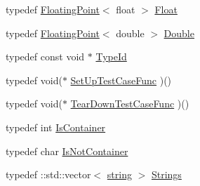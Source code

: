 \begin{DoxyCompactItemize}
typedef \hyperlink{classtesting_1_1internal_1_1_floating_point}{Floating\-Point}$<$ float $>$ \hyperlink{namespacetesting_1_1internal_a97de600d6dbfffe7091b878ac4b3a9a7}{Float}
\item 
typedef \hyperlink{classtesting_1_1internal_1_1_floating_point}{Floating\-Point}$<$ double $>$ \hyperlink{namespacetesting_1_1internal_a92debc9f055b7e7e1e4e861c5ae1c67a}{Double}
\item 
typedef const void $\ast$ \hyperlink{namespacetesting_1_1internal_a38c435cbab5f8b784e2e7f3356cab242}{Type\-Id}
\item 
typedef void($\ast$ \hyperlink{namespacetesting_1_1internal_ada14d66b5460b20e09071f51b9885c8d}{Set\-Up\-Test\-Case\-Func} )()
\item 
typedef void($\ast$ \hyperlink{namespacetesting_1_1internal_aad40244621b68546f3b830696225bf9b}{Tear\-Down\-Test\-Case\-Func} )()
\item 
typedef int \hyperlink{namespacetesting_1_1internal_ad8f0c2883245f1df2a53618a49f0deb3}{Is\-Container}
\item 
typedef char \hyperlink{namespacetesting_1_1internal_abf080521ce135deb510e0a7830fd3d33}{Is\-Not\-Container}
\item 
typedef \-::std\-::vector$<$ \hyperlink{namespacetesting_1_1internal_a5ca8a348395a6145775c1a2334e21889}{string} $>$ \hyperlink{namespacetesting_1_1internal_a7706b17f05f4b49e351b052ae4e05073}{Strings}
\end{DoxyCompactItemize}
